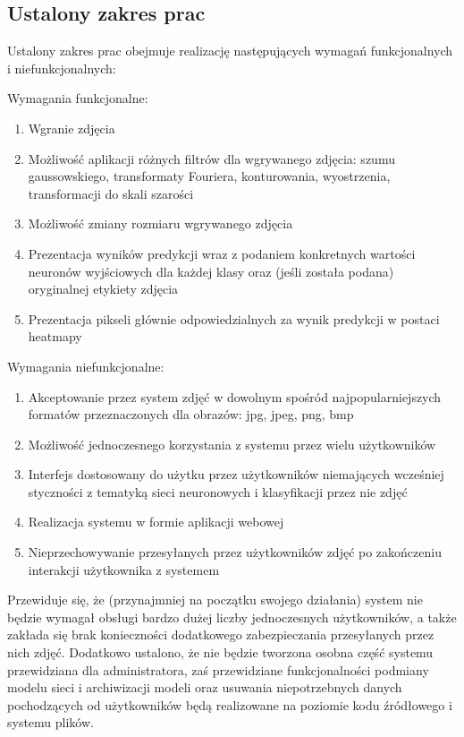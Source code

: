 \documentclass[polish,12pt]{aghthesis}
\begin{document}
\subsection{Ustalony zakres prac}
\par Ustalony zakres prac obejmuje realizację następujących wymagań funkcjonalnych i niefunkcjonalnych:
\vspace{5mm}
\par\noindent Wymagania funkcjonalne:
\begin{enumerate}
    \item Wgranie zdjęcia
    \item Możliwość aplikacji różnych filtrów dla wgrywanego zdjęcia: szumu gaussowskiego, transformaty Fouriera, konturowania, wyostrzenia, transformacji do skali szarości
    \item Możliwość zmiany rozmiaru wgrywanego zdjęcia
    \item Prezentacja wyników predykcji wraz z podaniem konkretnych wartości neuronów wyjściowych dla każdej klasy oraz (jeśli została podana) oryginalnej etykiety zdjęcia
    \item Prezentacja pikseli głównie odpowiedzialnych za wynik predykcji w postaci heatmapy
\end{enumerate}

\noindent
Wymagania niefunkcjonalne:
\begin{enumerate}
    \item Akceptowanie przez system zdjęć w dowolnym spośród najpopularniejszych formatów przeznaczonych dla obrazów: jpg, jpeg, png, bmp
    \item Możliwość jednoczesnego korzystania z systemu przez wielu użytkowników
    \item Interfejs dostosowany do użytku przez użytkowników niemających wcześniej styczności z tematyką sieci neuronowych i klasyfikacji przez nie zdjęć
    \item Realizacja systemu w formie aplikacji webowej
    \item Nieprzechowywanie przesyłanych przez użytkowników zdjęć po zakończeniu interakcji użytkownika z systemem
\end{enumerate}

\vspace{5mm}
\par Przewiduje się, że (przynajmniej na początku swojego działania) system nie będzie wymagał obsługi bardzo dużej liczby jednoczesnych użytkowników, a także zakłada się brak konieczności dodatkowego zabezpieczania przesyłanych przez nich zdjęć. Dodatkowo ustalono, że nie będzie tworzona osobna część systemu przewidziana dla administratora, zaś przewidziane funkcjonalności podmiany modelu sieci i archiwizacji modeli oraz usuwania niepotrzebnych danych pochodzących od użytkowników będą realizowane na poziomie kodu źródłowego i systemu plików.
\end{document}
